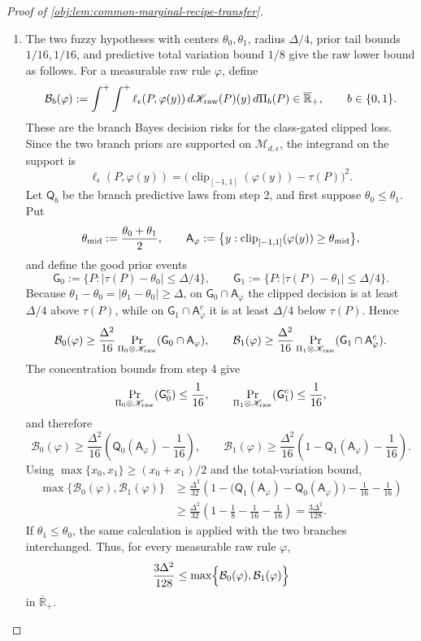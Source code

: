 \documentclass[11pt]{article}
\begin{document}
\begin{proof}[Proof of \cref{obj:lem:common-marginal-recipe-transfer}]
\begin{enumerate}
\item The two fuzzy hypotheses with centers \(\theta_0,\theta_1\), radius \(\Delta/4\), prior tail bounds \(1/16,1/16\), and predictive total variation bound \(1/8\) give the raw lower bound as follows.  For a measurable raw rule \(\varphi\), define
\[
\mathcal B_b(\varphi)
:=
\int^{+}
\int^{+}
\ell_\epsilon(P,\varphi(y))\,d\mathscr K_{\rm raw}(P)(y)\,d\Pi_b(P)
\in\overline{\mathbb R}_+,
\qquad b\in\{0,1\}.
\]
These are the branch Bayes decision risks for the class-gated clipped loss.  Since the two branch priors are supported on \(\mathcal M_{d,\epsilon}\), the integrand on the support is
\[
\ell_\epsilon(P,\varphi(y))
=
\bigl(\operatorname{clip}_{[-1,1]}(\varphi(y))-\tau(P)\bigr)^2.
\]
Let \(\mathsf Q_b\) be the branch predictive laws from step 2, and first suppose \(\theta_0\le\theta_1\).  Put
\[
\theta_{\rm mid}:=\frac{\theta_0+\theta_1}{2},
\qquad
\mathsf A_\varphi
:=
\bigl\{y:\operatorname{clip}_{[-1,1]}(\varphi(y))\ge\theta_{\rm mid}\bigr\},
\]
and define the good prior events
\[
\mathsf G_0:=\bigl\{P:|\tau(P)-\theta_0|\le\Delta/4\bigr\},
\qquad
\mathsf G_1:=\bigl\{P:|\tau(P)-\theta_1|\le\Delta/4\bigr\}.
\]
Because \(\theta_1-\theta_0=|\theta_1-\theta_0|\ge\Delta\), on \(\mathsf G_0\cap\mathsf A_\varphi\) the clipped decision is at least \(\Delta/4\) above \(\tau(P)\), while on \(\mathsf G_1\cap\mathsf A_\varphi^c\) it is at least \(\Delta/4\) below \(\tau(P)\).  Hence
\[
\mathcal B_0(\varphi)
\ge
\frac{\Delta^2}{16}
\Pr_{\Pi_0\otimes\mathscr K_{\rm raw}}(\mathsf G_0\cap\mathsf A_\varphi),
\qquad
\mathcal B_1(\varphi)
\ge
\frac{\Delta^2}{16}
\Pr_{\Pi_1\otimes\mathscr K_{\rm raw}}(\mathsf G_1\cap\mathsf A_\varphi^c).
\]
The concentration bounds from step 4 give
\[
\Pr_{\Pi_0\otimes\mathscr K_{\rm raw}}(\mathsf G_0^c)\le\frac1{16},
\qquad
\Pr_{\Pi_1\otimes\mathscr K_{\rm raw}}(\mathsf G_1^c)\le\frac1{16},
\]
and therefore
\[
\mathcal B_0(\varphi)
\ge
\frac{\Delta^2}{16}\left(\mathsf Q_0(\mathsf A_\varphi)-\frac1{16}\right),
\qquad
\mathcal B_1(\varphi)
\ge
\frac{\Delta^2}{16}\left(1-\mathsf Q_1(\mathsf A_\varphi)-\frac1{16}\right).
\]
Using \(\max\{x_0,x_1\}\ge(x_0+x_1)/2\) and the total-variation bound,
\[
\begin{aligned}
\max\{\mathcal B_0(\varphi),\mathcal B_1(\varphi)\}
&\ge
\frac{\Delta^2}{32}
\left(1-\bigl(\mathsf Q_1(\mathsf A_\varphi)-\mathsf Q_0(\mathsf A_\varphi)\bigr)-\frac1{16}-\frac1{16}\right)\\
&\ge
\frac{\Delta^2}{32}
\left(1-\frac18-\frac1{16}-\frac1{16}\right)
=
\frac{3\Delta^2}{128}.
\end{aligned}
\]
If \(\theta_1\le\theta_0\), the same calculation is applied with the two branches interchanged.  Thus, for every measurable raw rule \(\varphi\),
\[
\frac{3\Delta^2}{128}
\le
\max\Bigl\{
\mathcal B_0(\varphi),\mathcal B_1(\varphi)
\Bigr\}
\]
in \(\overline{\mathbb R}_+\). %


\end{enumerate}
\end{proof}
\end{document}
